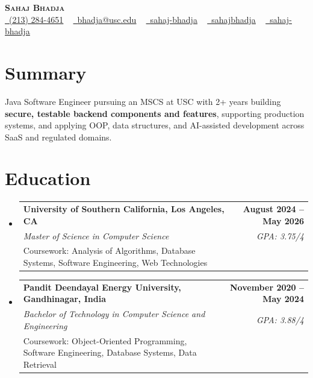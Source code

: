 \documentclass[letterpaper,10pt]{article}
\makeatletter
\newcommand{\resumeEduSubheading}[5]{\vspace{-1pt}\item\begin{tabular*}{1.0\textwidth}[t]{l@{\extracolsep{\fill}}r}\textbf{#1} & \textbf{\small #2} \\\textit{\small #3} & \textit{\small #4} \\\small #5 & \\\end{tabular*}\vspace{-4pt}}
\newcommand{\resumeSubHeadingListStart}{\begin{itemize}[leftmargin=0.0in, label={}]}
\newcommand{\resumeSubHeadingListEnd}{\end{itemize}}
\makeatother
\begin{document}
\begin{center}
{\Huge \scshape \textbf{Sahaj Bhadja}} \\ \vspace{1pt}
\small \href{tel:(213) 284-4651}{\faPhone\ \underline{(213) 284-4651}} ~ \href{mailto: bhadja@usc.edu}{\raisebox{-0.2\height}\faEnvelope\ \underline{bhadja@usc.edu}} ~
\href{https://www.linkedin.com/in/sahaj-bhadja/}{\raisebox{-0.2\height}\faLinkedin\ \underline{sahaj-bhadja}} ~ \href{https://github.com/SAHAJ-BHADJA}{\raisebox{-0.2\height}\faGithub\ \underline{sahajbhadja}} ~
\href{https://sahaj-bhadja.vercel.app/}{\raisebox{-0.2\height}\faGlobe\ \underline{sahaj-bhadja}}
\end{center}
\vspace{-16pt}
\section{Summary}
\begin{itemize}[leftmargin=0.15in, label={}]
\small{\item{Java Software Engineer pursuing an MSCS at USC with 2+ years building \textbf{secure, testable backend components and features}, supporting production systems, and applying OOP, data structures, and AI-assisted development across SaaS and regulated domains.}}
\end{itemize}
\vspace{-6pt}
\section{Education}
\resumeSubHeadingListStart
\resumeEduSubheading{University of Southern California, Los Angeles, CA}{August 2024 -- May 2026}{Master of Science in Computer Science}{GPA: 3.75/4}{Coursework: Analysis of Algorithms, Database Systems, Software Engineering, Web Technologies}
\vspace{-9pt}
\resumeEduSubheading{Pandit Deendayal Energy University, Gandhinagar, India}{November 2020 -- May 2024}{Bachelor of Technology in Computer Science and Engineering}{GPA: 3.88/4}{Coursework: Object-Oriented Programming, Software Engineering, Database Systems, Data Retrieval}
\resumeSubHeadingListEnd
\vspace{-6pt}
\end{document}
